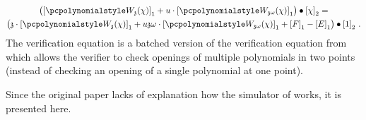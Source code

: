 \documentclass[runningheads,11pt]{llncs}
\theoremstyle{definition}
\begin{document}
\begin{description}
	\begin{multline}
		\label{eq:ver_eq}
		\left(
		\gone{\p{W_{\chz}}(\chi)} + u \cdot \gone{\p{W_{\chz \omega}}(\chi)}
		\right) \bullet
		\gtwo{\chi} = \\
		\left(
			\chz \cdot \gone{\p{W_{\chz}}(\chi)} + u \chz \omega \cdot \gone{\p{W_{\chz \omega}}(\chi)} + \gone{F} - \gone{E}
		\right) \bullet
		\gtwo{1}\,.
	\end{multline}
The verification equation is a batched version of the verification equation from \cite{AC:KatZavGol10} which allows the verifier to check openings of multiple polynomials in two points (instead of checking an opening of a single polynomial at one point).
\end{description}

Since the original paper \cite{EPRINT:GabWilCio19} lacks of explanation how the simulator of \plonk{} works, it is presented here.
\end{document}

